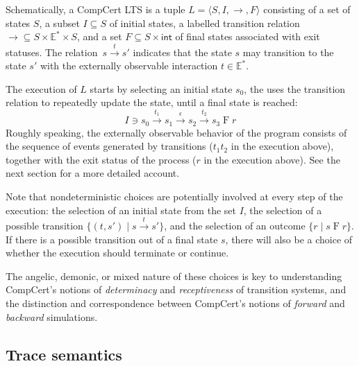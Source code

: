 \documentclass[11pt,oneside,draft]{book}
\theoremstyle{definition}
\newcommand{\kw}[1]{\ensuremath{ \mathsf{#1} }}
\begin{document}
Schematically, a CompCert LTS
is a tuple
$L = \langle S, I, {\rightarrow}, F \rangle$
consisting of
a set of states $S$,
a subset $I \subseteq S$ of initial states,
a labelled transition relation
${\rightarrow} \subseteq S \times \mathbb{E}^* \times S$,
and a set
$F \subseteq S \times \kw{int}$
of final states associated with exit statuses.
The relation~$s \stackrel{t}{\rightarrow} s'$
indicates that the state $s$ may transition to the state $s'$
with the externally observable interaction $t \in \mathbb{E}^*$.

The execution of $L$ starts by selecting an initial state $s_0$,
the uses the transition relation to repeatedly update the state,
until a final state is reached:
\[
  I \ni s_0
  \xrightarrow{t_1} s_1
  \xrightarrow{\epsilon} s_2
  \xrightarrow{t_2} s_3
  \mathrel{F} r
\]
Roughly speaking,
the externally observable behavior of the program
consists of the sequence of events generated by transitions
($t_1 t_2$ in the execution above),
together with the exit status of the process
($r$ in the execution above).
See the next section for a more detailed account.

Note that nondeterministic choices
are potentially involved at every step of the execution:
the selection of an initial state from the set $I$,
the selection of a possible transition $\{ (t, s') \mid s \xrightarrow{t} s' \}$,
and the selection of an outcome $\{ r \mid s \mathrel{F} r \}$.
If there is a possible transition out of a final state $s$,
there will also be a choice of whether the execution should terminate
or continue.

The angelic, demonic, or mixed nature of these choices
is key to understanding CompCert's
notions of \emph{determinacy} and \emph{receptiveness}
of transition systems,
and the distinction and correspondence between
CompCert's notions of \emph{forward} and \emph{backward} simulations.


\subsection{Trace semantics} %
\end{document}
